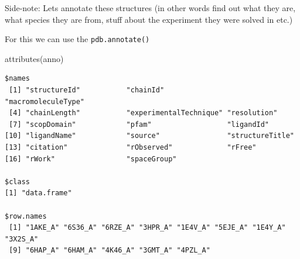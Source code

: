 \documentclass[
  letterpaper,
  DIV=11,
  numbers=noendperiod]{scrartcl}
\newenvironment{Shaded}{\begin{snugshade}}{\end{snugshade}}
\newcommand{\ConstantTok}[1]{\textcolor[rgb]{0.56,0.35,0.01}{#1}}
\newcommand{\FunctionTok}[1]{\textcolor[rgb]{0.28,0.35,0.67}{#1}}
\newcommand{\NormalTok}[1]{\textcolor[rgb]{0.00,0.23,0.31}{#1}}
\newcommand{\OtherTok}[1]{\textcolor[rgb]{0.00,0.23,0.31}{#1}}
\newcommand{\SpecialCharTok}[1]{\textcolor[rgb]{0.37,0.37,0.37}{#1}}
\newcommand{\StringTok}[1]{\textcolor[rgb]{0.13,0.47,0.30}{#1}}
\begin{document}
\begin{Shaded}
\end{Shaded}

Side-note: Lets annotate these structures (in other words find out what
they are, what species they are from, stuff about the experiment they
were solved in etc.)

For this we can use the \texttt{pdb.annotate()}

\begin{Shaded}
\end{Shaded}

\begin{Shaded}
\begin{Highlighting}[]
\FunctionTok{attributes}\NormalTok{(anno)}
\end{Highlighting}
\end{Shaded}

\begin{verbatim}
$names
 [1] "structureId"           "chainId"               "macromoleculeType"    
 [4] "chainLength"           "experimentalTechnique" "resolution"           
 [7] "scopDomain"            "pfam"                  "ligandId"             
[10] "ligandName"            "source"                "structureTitle"       
[13] "citation"              "rObserved"             "rFree"                
[16] "rWork"                 "spaceGroup"           

$class
[1] "data.frame"

$row.names
 [1] "1AKE_A" "6S36_A" "6RZE_A" "3HPR_A" "1E4V_A" "5EJE_A" "1E4Y_A" "3X2S_A"
 [9] "6HAP_A" "6HAM_A" "4K46_A" "3GMT_A" "4PZL_A"
\end{verbatim}
\end{document}
